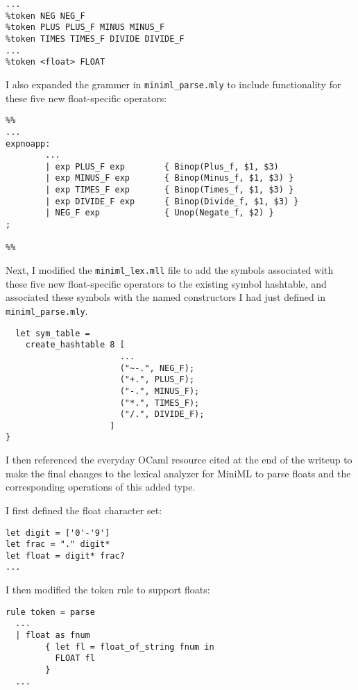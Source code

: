 \documentclass[12pt]{extarticle}
\begin{document}
\footnotesize
\begin{verbatim}
...
%token NEG NEG_F
%token PLUS PLUS_F MINUS MINUS_F
%token TIMES TIMES_F DIVIDE DIVIDE_F
...
%token <float> FLOAT
\end{verbatim}

\vspace{0.3cm}
\normalsize
I also expanded the grammer in \texttt{miniml_parse.mly} to include functionality for these five new float-specific operators:

\footnotesize
\begin{verbatim}
%%
...
expnoapp: 
        ...
        | exp PLUS_F exp        { Binop(Plus_f, $1, $3) 
        | exp MINUS_F exp       { Binop(Minus_f, $1, $3) }
        | exp TIMES_F exp       { Binop(Times_f, $1, $3) }
        | exp DIVIDE_F exp      { Binop(Divide_f, $1, $3) }
        | NEG_F exp             { Unop(Negate_f, $2) }
;

%%
\end{verbatim}

\vspace{0.3cm}
\normalsize
Next, I modified the \texttt{miniml_lex.mll} file to add the symbols associated with these five new float-specific operators to the existing symbol hashtable, and associated these symbols with the named constructors I had just defined in \texttt{miniml_parse.mly}.

\footnotesize
\begin{verbatim}
  let sym_table = 
    create_hashtable 8 [
                       ...
                       ("~-.", NEG_F);
                       ("+.", PLUS_F);
                       ("-.", MINUS_F);
                       ("*.", TIMES_F);
                       ("/.", DIVIDE_F);
                     ]
}
\end{verbatim}

\vspace{0.3cm}
\normalsize
I then referenced the everyday OCaml resource cited at the end of the writeup to make the final changes to the lexical analyzer for MiniML to parse floats and the corresponding operations of this added type.

\vspace{0.3cm}
I first defined the float character set:
\footnotesize
\begin{verbatim}
let digit = ['0'-'9']
let frac = "." digit*
let float = digit* frac? 
...
\end{verbatim}

\vspace{0.3cm}
\normalsize
I then modified the token rule to support floats:
\vspace{0.3cm}
\footnotesize
\begin{verbatim}
rule token = parse
  ...
  | float as fnum
        { let fl = float_of_string fnum in
          FLOAT fl
        }
  ...
\end{verbatim}
\end{document}
